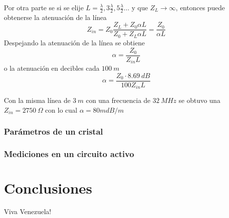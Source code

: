 \documentclass[a4paper,10pt]{article}
\begin{document}
		Por otra parte se si se elije $L=\frac{\lambda}{2},3\frac{\lambda}{2}, 5\frac{\lambda}{2} ...$ y que $Z_L\rightarrow\infty$, entonces puede obtenerse la atenuaci\'on de la l\'inea
		$$Z_{in}=Z_0\frac{Z_L+Z_0\alpha L}{Z_0+Z_L\alpha L}=\frac{Z_0}{\alpha L}$$
		Despejando la atenuaci\'on de la l\'inea se obtiene
		$$\alpha=\frac{Z_0}{Z_{in} L}$$
		o la atenuaci\'on en decibles cada $100~m$
		$$\alpha=\frac{Z_0\cdot8.69~dB}{100Z_{in} L}$$
		
		Con la misma l\'inea de  $3~m$ con una frecuencia de $32~MHz$ se obtuvo una $Z_{in}=2750~\Omega$ con lo cual $\alpha=80 mdB/m$
		\subsubsection{Par\'ametros de un cristal}	
		\subsubsection{Mediciones en un circuito activo}
			
	\section{Conclusiones}
	\indent Viva Venezuela!\\
\end{document}
